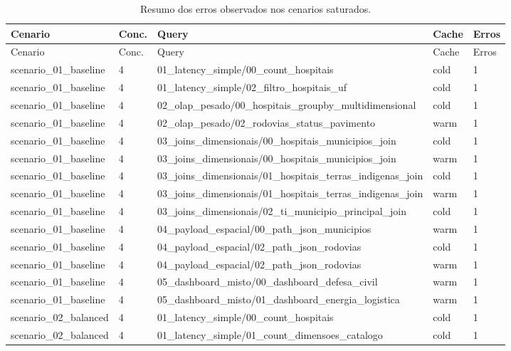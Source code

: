 {
\footnotesize
\setlength{\tabcolsep}{4pt}
\renewcommand{\arraystretch}{1.15}
\begin{longtable}{p{}p{}p{}p{}p{}}
\caption{Resumo dos erros observados nos cenarios saturados.}\\
\toprule
Cenario & Conc. & Query & Cache & Erros \\
\midrule
\endfirsthead
\toprule
Cenario & Conc. & Query & Cache & Erros \\
\midrule
\endhead
scenario\_01\_baseline & 4 & 01\_latency\_simple/00\_count\_hospitais & cold & 1 \\
scenario\_01\_baseline & 4 & 01\_latency\_simple/02\_filtro\_hospitais\_uf & cold & 1 \\
scenario\_01\_baseline & 4 & 02\_olap\_pesado/00\_hospitais\_groupby\_multidimensional & cold & 1 \\
scenario\_01\_baseline & 4 & 02\_olap\_pesado/02\_rodovias\_status\_pavimento & warm & 1 \\
scenario\_01\_baseline & 4 & 03\_joins\_dimensionais/00\_hospitais\_municipios\_join & cold & 1 \\
scenario\_01\_baseline & 4 & 03\_joins\_dimensionais/00\_hospitais\_municipios\_join & warm & 1 \\
scenario\_01\_baseline & 4 & 03\_joins\_dimensionais/01\_hospitais\_terras\_indigenas\_join & cold & 1 \\
scenario\_01\_baseline & 4 & 03\_joins\_dimensionais/01\_hospitais\_terras\_indigenas\_join & warm & 1 \\
scenario\_01\_baseline & 4 & 03\_joins\_dimensionais/02\_ti\_municipio\_principal\_join & cold & 1 \\
scenario\_01\_baseline & 4 & 04\_payload\_espacial/00\_path\_json\_municipios & warm & 1 \\
scenario\_01\_baseline & 4 & 04\_payload\_espacial/02\_path\_json\_rodovias & cold & 1 \\
scenario\_01\_baseline & 4 & 04\_payload\_espacial/02\_path\_json\_rodovias & warm & 1 \\
scenario\_01\_baseline & 4 & 05\_dashboard\_misto/00\_dashboard\_defesa\_civil & warm & 1 \\
scenario\_01\_baseline & 4 & 05\_dashboard\_misto/01\_dashboard\_energia\_logistica & warm & 1 \\
scenario\_02\_balanced & 4 & 01\_latency\_simple/00\_count\_hospitais & cold & 1 \\
scenario\_02\_balanced & 4 & 01\_latency\_simple/01\_count\_dimensoes\_catalogo & cold & 1 \\

\end{longtable}}
